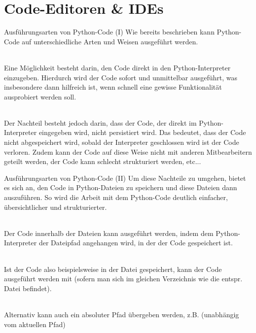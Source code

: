 \newcommand{\decktitle}{Editoren \& IDEs}

%
%


		
\section{Code-Editoren \& IDEs}

  \begin{frame}{Ausführungsarten von Python-Code (I)}
      Wie bereits beschrieben kann Python-Code auf unterschiedliche Arten und Weisen ausgeführt werden. \\~\
      
      Eine Möglichkeit besteht darin, den Code direkt in den Python-Interpreter einzugeben. Hierdurch wird der Code sofort und unmittelbar ausgeführt, was insbesondere dann hilfreich ist, wenn schnell eine gewisse Funktionalität ausprobiert werden soll. \\~\
      
      Der Nachteil besteht jedoch darin, dass der Code, der direkt im Python-Interpreter eingegeben wird, nicht persistiert wird. Das bedeutet, dass der Code nicht abgespeichert wird, sobald der Interpreter geschlossen wird ist der Code verloren. Zudem kann der Code auf diese Weise nicht mit anderen Mitbearbeitern geteilt werden, der Code kann schlecht strukturiert werden, etc...
  \end{frame}
  
    \begin{frame}{Ausführungsarten von Python-Code (II)}
      Um diese Nachteile zu umgehen, bietet es sich an, den Code in Python-Dateien zu speichern und diese Dateien dann auszuführen. So wird die Arbeit mit dem Python-Code deutlich einfacher, übersichtlicher und strukturierter. \\~\
      
      Der Code innerhalb der Dateien kann ausgeführt werden, indem dem Python-Interpreter der Dateipfad angehangen wird, in der der Code gespeichert ist. \\~\
      
      Ist der Code also beispielsweise in der Datei  gespeichert, kann der Code ausgeführt werden mit  (sofern man sich im gleichen Verzeichnis wie die entspr. Datei befindet). \\~\
      
      Alternativ kann auch ein absoluter Pfad übergeben werden, z.B.  (unabhängig vom aktuellen Pfad)
      
  \end{frame}
  
